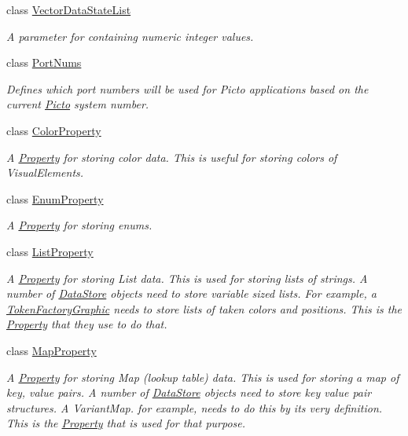 \begin{DoxyCompactItemize}
class \hyperlink{class_picto_1_1_vector_data_state_list}{Vector\-Data\-State\-List}
\begin{DoxyCompactList}\small\item\em A parameter for containing numeric integer values. \end{DoxyCompactList}\item 
class \hyperlink{class_picto_1_1_port_nums}{Port\-Nums}
\begin{DoxyCompactList}\small\item\em Defines which port numbers will be used for Picto applications based on the current \hyperlink{namespace_picto}{Picto} system number. \end{DoxyCompactList}\item 
class \hyperlink{class_picto_1_1_color_property}{Color\-Property}
\begin{DoxyCompactList}\small\item\em A \hyperlink{class_picto_1_1_property}{Property} for storing color data. This is useful for storing colors of Visual\-Elements. \end{DoxyCompactList}\item 
class \hyperlink{class_picto_1_1_enum_property}{Enum\-Property}
\begin{DoxyCompactList}\small\item\em A \hyperlink{class_picto_1_1_property}{Property} for storing enums. \end{DoxyCompactList}\item 
class \hyperlink{class_picto_1_1_list_property}{List\-Property}
\begin{DoxyCompactList}\small\item\em A \hyperlink{class_picto_1_1_property}{Property} for storing List data. This is used for storing lists of strings. A number of \hyperlink{class_picto_1_1_data_store}{Data\-Store} objects need to store variable sized lists. For example, a \hyperlink{class_picto_1_1_token_factory_graphic}{Token\-Factory\-Graphic} needs to store lists of taken colors and positions. This is the \hyperlink{class_picto_1_1_property}{Property} that they use to do that. \end{DoxyCompactList}\item 
class \hyperlink{class_picto_1_1_map_property}{Map\-Property}
\begin{DoxyCompactList}\small\item\em A \hyperlink{class_picto_1_1_property}{Property} for storing Map (lookup table) data. This is used for storing a map of key, value pairs. A number of \hyperlink{class_picto_1_1_data_store}{Data\-Store} objects need to store key value pair structures. A Variant\-Map. for example, needs to do this by its very definition. This is the \hyperlink{class_picto_1_1_property}{Property} that is used for that purpose. \end{DoxyCompactList}\item 

\end{DoxyCompactItemize}
